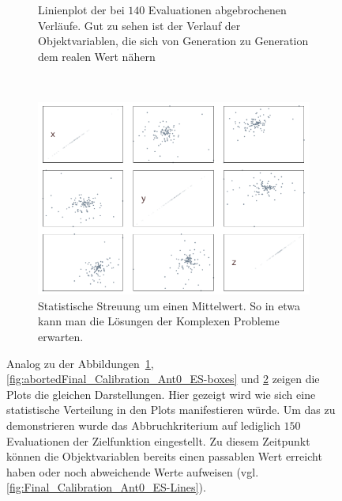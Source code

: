 \begin{figure}[!ht]
\begin{subfigure}[t]{0.4\textwidth}
                 \caption{Linienplot der bei $140$ Evaluationen abgebrochenen Verläufe. Gut zu sehen ist der Verlauf der Objektvariablen, die sich von Generation zu Generation dem realen Wert nähern}
                 \label{fig:abortedFinal_Calibration_Ant0_ES-Lines}
         \end{subfigure}
%
\\
%
         \begin{subfigure}[t]{0.4\textwidth}
                 \centering
                 \includegraphics[width=\textwidth]{img/calibration/aborted_calibration_ant0-scatter.png}
                 \caption{Statistische Streuung um einen Mittelwert. So in etwa kann man die Lösungen der Komplexen Probleme erwarten.}
                 \label{fig:abortedFinal_Calibration_Ant0_ES-Scatter}
         \end{subfigure}
%
         \caption[Statistisch verteilte Ergebnisse der Kalibrierung mittels ES]{Analog zu der Abbildungen~\ref        {fig:abortedFinal_Calibration_Ant0_ES-Lines}, \ref{fig:abortedFinal_Calibration_Ant0_ES-boxes} und \ref{fig:abortedFinal_Calibration_Ant0_ES-Scatter} zeigen die Plots die gleichen Darstellungen. Hier gezeigt wird wie sich eine statistische Verteilung in den Plots manifestieren würde. Um das zu demonstrieren wurde das Abbruchkriterium auf lediglich $150$ Evaluationen der Zielfunktion eingestellt. Zu diesem Zeitpunkt können die Objektvariablen bereits einen passablen Wert erreicht haben oder noch abweichende Werte aufweisen (vgl. \ref{fig:Final_Calibration_Ant0_ES-Lines}).}
         \label{fig::abortedFinal_Calibration_Ant0_ES}
\end{figure}
%
